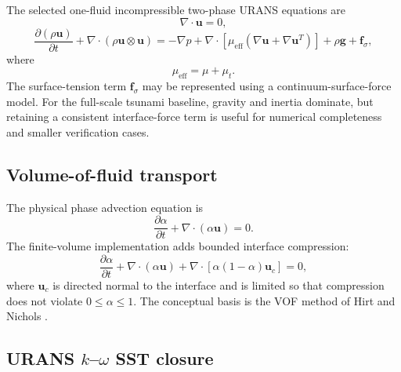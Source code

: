 \documentclass[11pt,a4paper]{article}
\newcommand{\vect}[1]{\bm{#1}}
\newcommand{\grad}{\nabla}
\newcommand{\Div}{\nabla\!\cdot}
\begin{document}
The selected one-fluid incompressible two-phase URANS equations are
\begin{equation}
  \Div\vect u=0,
  \label{eq:localcontinuity}
\end{equation}
\begin{equation}
  \frac{\partial(\rho\vect u)}{\partial t}
  +\Div(\rho\vect u\otimes\vect u)
  =-\grad p
  +\Div\left[\mu_{\mathrm{eff}}
  \left(\grad\vect u+\grad\vect u^T\right)\right]
  +\rho\vect g
  +\vect f_\sigma,
  \label{eq:localmomentum}
\end{equation}
where
\begin{equation}
  \mu_{\mathrm{eff}}=\mu+\mu_t.
\end{equation}
The surface-tension term $\vect f_\sigma$ may be represented using a continuum-surface-force model. For the full-scale tsunami baseline, gravity and inertia dominate, but retaining a consistent interface-force term is useful for numerical completeness and smaller verification cases.

\subsection{Volume-of-fluid transport}

The physical phase advection equation is
\begin{equation}
  \frac{\partial\alpha}{\partial t}
  +\Div(\alpha\vect u)=0.
  \label{eq:vofphysical}
\end{equation}
The finite-volume implementation adds bounded interface compression:
\begin{equation}
  \frac{\partial\alpha}{\partial t}
  +\Div(\alpha\vect u)
  +\Div\left[\alpha(1-\alpha)\vect u_c\right]=0,
  \label{eq:vofcompressed}
\end{equation}
where $\vect u_c$ is directed normal to the interface and is limited so that compression does not violate $0\le\alpha\le1$. The conceptual basis is the VOF method of Hirt and Nichols \cite{hirtNichols1981}.

\subsection{URANS $k$--$\omega$ SST closure}
\end{document}
